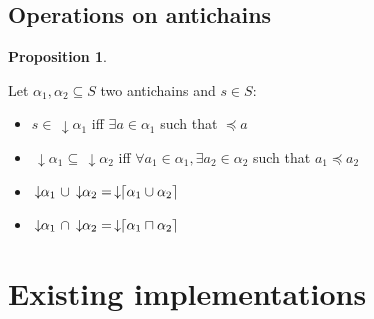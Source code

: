 \documentclass[letterpaper]{article}
\DeclarePairedDelimiter{\ceil}{\lceil}{\rceil}
\newcommand{\darrow}{\, \downarrow \!\!}
\theoremstyle{definition}
\newtheorem{proposition}{Proposition}[subsection]
\begin{document}
\subsection{Operations on antichains}




\begin{proposition}

\label{antichains_ops}

Let $\alpha_1, \alpha_2 \subseteq S$ two antichains and $s \in S$:

\begin{itemize}
    \item $s \in \darrow \alpha_1$
    iff $\exists a \in \alpha_1$ such that $\preceq a$
    \item $\darrow \alpha_1 \subseteq \darrow \alpha_2$
    iff $\forall a_1 \in \alpha_1,
    \exists a_2 \in \alpha_2$ such that $a_1 \preceq a_2$
    \item $ \darrow \alpha_1 \ \cup \darrow \alpha_2 =
    \darrow \ceil{\alpha_1 \cup \alpha_2}$
    \item $\darrow \alpha_1 \ \cap \darrow \alpha_2 =
    \darrow \ceil{\alpha_1 \sqcap \alpha_2}$


\end{itemize}

\end{proposition}



%
%

\newpage


\section{Existing implementations}

\end{document}
